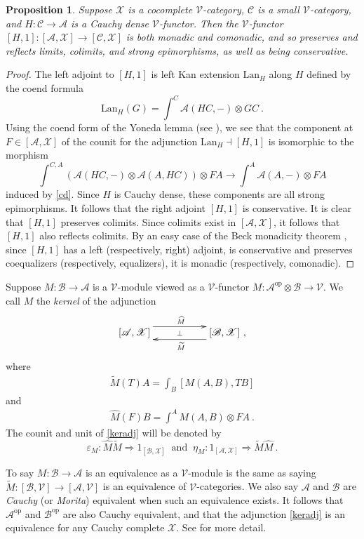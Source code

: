 \documentclass[a4paper,12pt,reqno]{amsart}
\newtheorem{proposition}[theorem]{Proposition}
\theoremstyle{definition}
\theoremstyle{fact}
\theoremstyle{genquest}
\theoremstyle{step}
\newcommand{\dd}{\colon}
\newcommand{\lra}{\longrightarrow}
\newcommand{\ra}{\rightarrow}
\newcommand{\Lra}{\Longrightarrow}
\def\CA{{\mathscr A}}
\def\CB{{\mathscr B}}
\def\CC{{\mathscr C}}
\def\CV{{\mathscr V}}
\def\CX{{\mathscr X}}
\begin{document}
\begin{proposition}\label{Cdmonadicity}
Suppose $\CX$ is a cocomplete $\CV$-category, $\CC$ is a small $\CV$-category,
and $H\dd \CC \ra \CA$ is a Cauchy dense $\CV$-functor. 
Then the $\CV$-functor $[H,1] \dd [\CA,\CX]\ra [\CC,\CX]$ is both monadic 
and comonadic, and so preserves and
reflects limits, colimits, and strong epimorphisms, as well as being conservative. 
\end{proposition}
\begin{proof}
The left adjoint to $[H,1]$ is left Kan extension $\mathrm{Lan}_H$ along $H$
defined by the coend formula
$$\mathrm{Lan}_H(G) = \int^C{\CA(HC,-)\otimes GC} \ .$$
Using the coend form of the Yoneda lemma (see \cite{efc}),
we see that the component at $F\in [\CA,\CX]$ of the counit for the adjunction
$\mathrm{Lan}_H \dashv [H,1]$ 
is isomorphic to the morphism
$$\int^{C,A}{(\CA(HC,-)\otimes \CA(A,HC))\otimes FA}\lra \int^A{\CA(A,-)\otimes FA}$$
induced by \eqref{cd}.
Since $H$ is Cauchy dense, these components are all strong epimorphisms.
It follows that the right adjoint $[H,1]$ is conservative.
It is clear that $[H,1]$ preserves colimits.
Since colimits exist in $[\CA,\CX]$, it follows that $[H,1]$ also reflects colimits.
By an easy case of the Beck monadicity theorem \cite{ML1963}, 
since $[H,1]$ has a left (respectively, right) adjoint,
is conservative and preserves coequalizers (respectively, equalizers), 
it is monadic (respectively, comonadic).    
\end{proof}

Suppose $M\dd \CB\ra \CA$ is a $\CV$-module viewed as a
$\CV$-functor $M\dd \CA^{\mathrm{op}} \otimes \CB \ra \CV$.
We call $M$ the {\em kernel} of the adjunction
\begin{equation}\label{keradj} 
\xymatrix @R-3mm {
[\CA,\CX] \ar@<1.5ex>[rr]^{\widehat{M}} \ar@{}[rr]|-{\bot} && [\CB,\CX]
 \ar@<1.5ex>[ll]^{\widetilde{M}} \ ,
}
\end{equation}
where 
\begin{eqnarray}\label{endtilde}
\widetilde{M}(T)A = \int_B{[M(A,B),TB]}
\end{eqnarray}
and
\begin{eqnarray}\label{coendhat}
\widehat{M}(F)B = \int^A{M(A,B)\otimes FA \ .}
\end{eqnarray}
The counit and unit of \eqref{keradj} will be denoted by
$$\varepsilon_M \dd \widehat{M}\widetilde{M}\Lra 1_{[\CB,\CX]} \ \text{ and } \ 
\eta_M \dd 1_{[\CA,\CX]} \Lra \widetilde{M} \widehat{M} \ .$$

To say $M\dd \CB\ra \CA$ is an equivalence as a $\CV$-module
is the same as saying $\widetilde{M}\dd [\CB,\CV]\ra [\CA,\CV]$
is an equivalence of $\CV$-categories. We also say $\CA$
and $\CB$ are {\em Cauchy} (or {\em Morita}) equivalent when
such an equivalence exists. 
It follows that $\CA^{\mathrm{op}}$
and $\CB^{\mathrm{op}}$ are also Cauchy equivalent,
and that the adjunction \eqref{keradj} is an equivalence for any
Cauchy complete $\CX$.   
See \cite{ECC} for more detail.    
\end{document}

